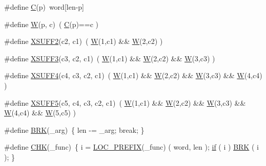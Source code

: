 \begin{DoxyCompactItemize}
\item 
\#define \hyperlink{sphinxstemru_8inl_adb9bc29996ff9b1fe0f69f11ef99444a}{C}(p)~word\mbox{[}len-\/p\mbox{]}
\item 
\#define \hyperlink{sphinxstemru_8inl_a6517260a8b67f7380c81a3fef7a5cdfb}{W}(p, c)~( \hyperlink{sphinxstemru_8inl_adb9bc29996ff9b1fe0f69f11ef99444a}{C}(p)==c )
\item 
\#define \hyperlink{sphinxstemru_8inl_a6934aaa816e6d492db7fee51a676b6cb}{X\-S\-U\-F\-F2}(c2, c1)~( \hyperlink{sphinxstemru_8inl_a6517260a8b67f7380c81a3fef7a5cdfb}{W}(1,c1) \&\& \hyperlink{sphinxstemru_8inl_a6517260a8b67f7380c81a3fef7a5cdfb}{W}(2,c2) )
\item 
\#define \hyperlink{sphinxstemru_8inl_acc1d03553f28f387de64f3f8528226e3}{X\-S\-U\-F\-F3}(c3, c2, c1)~( \hyperlink{sphinxstemru_8inl_a6517260a8b67f7380c81a3fef7a5cdfb}{W}(1,c1) \&\& \hyperlink{sphinxstemru_8inl_a6517260a8b67f7380c81a3fef7a5cdfb}{W}(2,c2) \&\& \hyperlink{sphinxstemru_8inl_a6517260a8b67f7380c81a3fef7a5cdfb}{W}(3,c3) )
\item 
\#define \hyperlink{sphinxstemru_8inl_abaeebedcacc70a36999e0a1079470e66}{X\-S\-U\-F\-F4}(c4, c3, c2, c1)~( \hyperlink{sphinxstemru_8inl_a6517260a8b67f7380c81a3fef7a5cdfb}{W}(1,c1) \&\& \hyperlink{sphinxstemru_8inl_a6517260a8b67f7380c81a3fef7a5cdfb}{W}(2,c2) \&\& \hyperlink{sphinxstemru_8inl_a6517260a8b67f7380c81a3fef7a5cdfb}{W}(3,c3) \&\& \hyperlink{sphinxstemru_8inl_a6517260a8b67f7380c81a3fef7a5cdfb}{W}(4,c4) )
\item 
\#define \hyperlink{sphinxstemru_8inl_a0216a91473f81d295f108fd939597b44}{X\-S\-U\-F\-F5}(c5, c4, c3, c2, c1)~( \hyperlink{sphinxstemru_8inl_a6517260a8b67f7380c81a3fef7a5cdfb}{W}(1,c1) \&\& \hyperlink{sphinxstemru_8inl_a6517260a8b67f7380c81a3fef7a5cdfb}{W}(2,c2) \&\& \hyperlink{sphinxstemru_8inl_a6517260a8b67f7380c81a3fef7a5cdfb}{W}(3,c3) \&\& \hyperlink{sphinxstemru_8inl_a6517260a8b67f7380c81a3fef7a5cdfb}{W}(4,c4) \&\& \hyperlink{sphinxstemru_8inl_a6517260a8b67f7380c81a3fef7a5cdfb}{W}(5,c5) )
\item 
\#define \hyperlink{sphinxstemru_8inl_aedfece91756041fb82eccb28a953f700}{B\-R\-K}(\-\_\-arg)~\{ len -\/= \-\_\-arg; break; \}
\item 
\#define \hyperlink{sphinxstemru_8inl_a8feb1bda7113da53176c51babd173105}{C\-H\-K}(\-\_\-func)~\{ i = \hyperlink{sphinxstemru_8inl_a239cc7b2d29b4af3b38b5c1871a09587}{L\-O\-C\-\_\-\-P\-R\-E\-F\-I\-X}(\-\_\-func) ( word, len ); \hyperlink{sphinxsort_8cpp_ac158031fa822cf4eec61a9d38d1afe23}{if} ( i ) \hyperlink{sphinxstemru_8inl_aedfece91756041fb82eccb28a953f700}{B\-R\-K} ( i ); \}
\end{DoxyCompactItemize}
